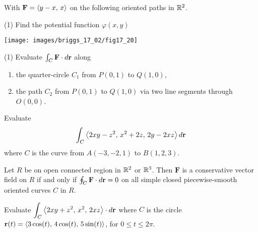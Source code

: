 \documentclass[mathNotesPreamble]{subfiles}
\begin{document}
  \begin{ex*}
     With $\mathbf F={\left\langle y-x,\,x \right\rangle}$ on the following oriented paths in $\mathbb{R}^2$.
  \end{ex*}
  \vspace*{-\baselineskip}
  \noindent
  \begin{minipage}[t]{0.6\linewidth}\mbox{}
    \begin{tasks}[after-item-skip=8\baselineskip, label=\alph*)](1)
      \task 
        Find the potential function $\varphi(x,y)$
    \end{tasks}
  \end{minipage}
  \begin{minipage}[t]{0.4\linewidth}\mbox{}
    \begin{flushright}
      \texttt{[image: images/briggs\_17\_02/fig17\_20]}
    \end{flushright}
  \end{minipage}
  \begin{tasks}[after-item-skip=\stretch{1}, label=\alph*), resume](1)
    \task 
      Evaluate $\int_C \mathbf F\cdot d{\mathbf{r}}$ along
      \begin{enumerate}[itemsep=6\baselineskip, label=]
        \item 
          the quarter-circle $C_1$ from $P(0,1)$ to $Q(1,0)$,
        \item 
          the path $C_2$ from $P(0,1)$ to $Q(1,0)$ via two line segments through $O(0,0)$.
      \end{enumerate}
  \end{tasks}
  \pagebreak

  \begin{ex*}
    Evaluate
      \[\int_C {\left\langle 2xy-z^2,\, x^2+2z,\,2y-2xz \right\rangle}\,d{\mathbf{r}}\]
    where $C$ is the curve from $A(-3,-2,1)$ to $B(1,2,3)$.
  \end{ex*}
  \pagebreak

  \begin{thmBox*}
    Let $R$ be on open connected region in $\mathbb{R}^2$ or $\mathbb{R}^3$. Then $\mathbf F$ is a conservative vector field on $R$ if and only if $\oint_C \mathbf F\cdot d{\mathbf{r}}=0$ on all simple closed piecewise-smooth oriented curves $C$ in $R$.
  \end{thmBox*}

  \begin{ex*}
    Evaluate $\displaystyle \int_C {\left\langle 2xy+z^2,\,x^2,\,2xz \right\rangle}\cdot d{\mathbf{r}}$ where $C$ is the circle \newline${\mathbf{r}}(t)={\left\langle 3\cos(t),\,4\cos(t),\,5\sin(t) \right\rangle}$, for $0\leq t\leq 2\pi$.
  \end{ex*}

  \pagebreak
  
\end{document}
